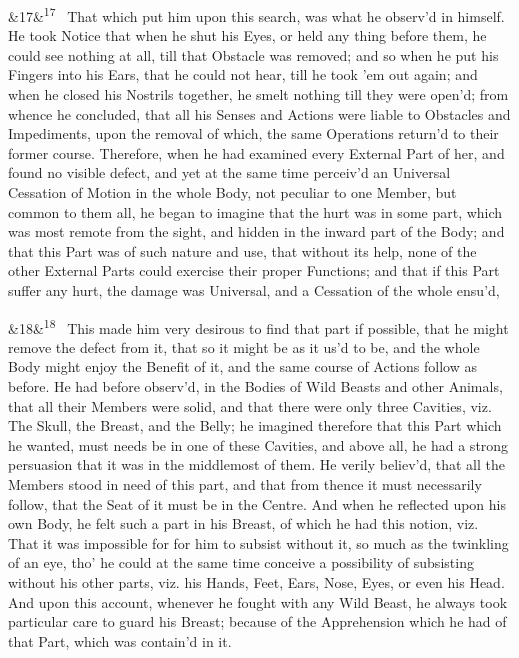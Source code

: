 \documentclass[12pt]{article}
\newcommand{\para}[1][]{\par\noindent\ifx&#1&\else\textsuperscript{\footnotesize #1}~\fi}
\begin{document}
\para[17] That which put him upon this search, was what he observ'd in himself. He took Notice that when he shut his Eyes, or held any thing before them, he could see nothing at all, till that Obstacle was removed; and so when he put his Fingers into his Ears, that he could not hear, till he took 'em out again; and when he closed his Nostrils together, he smelt nothing till they were open'd; from whence he concluded, that all his Senses and Actions were liable to Obstacles and Impediments, upon the removal of which, the same Operations return'd to their former course. Therefore, when he had examined every External Part of her, and found no visible defect, and yet at the same time perceiv'd an Universal Cessation of Motion in the whole Body, not peculiar to one Member, but common to them all, he began to imagine that the hurt was in some part, which was most remote from the sight, and hidden in the inward part of the Body; and that this Part was of such nature and use, that without its help, none of the other External Parts could exercise their proper Functions; and that if this Part suffer any hurt, the damage was Universal, and a Cessation of the whole ensu'd,

\para[18] This made him very desirous to find that part if possible, that he might remove the defect from it, that so it might be as it us'd to be, and the whole Body might enjoy the Benefit of it, and the same course of Actions follow as before. He had before observ'd, in the Bodies of Wild Beasts and other Animals, that all their Members were solid, and that there were only three Cavities, viz. The Skull, the Breast, and the Belly; he imagined therefore that this Part which he wanted, must needs be in one of these Cavities, and above all, he had a strong persuasion that it was in the middlemost of them. He verily believ'd, that all the Members stood in need of this part, and that from thence it must necessarily follow, that the Seat of it must be in the Centre. And when he reflected upon his own Body, he felt such a part in his Breast, of which he had this notion, viz. That it was impossible for for him to subsist without it, so much as the twinkling of an eye, tho' he could at the same time conceive a possibility of subsisting without his other parts, viz. his Hands, Feet, Ears, Nose, Eyes, or even his Head. And upon this account, whenever he fought with any Wild Beast, he always took particular care to guard his Breast; because of the Apprehension which he had of that Part, which was contain'd in it.
\end{document}
